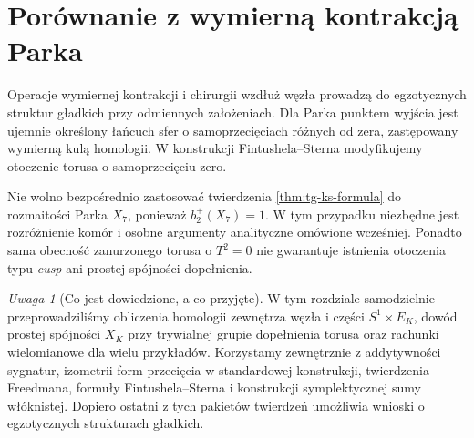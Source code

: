 \documentclass[11pt,a4paper]{report}
\numberwithin{equation}{section}
\theoremstyle{plain}
\theoremstyle{definition}
\theoremstyle{remark}
\newtheorem{uwaga}[twierdzenie]{Uwaga}
\begin{document}
\section{Porównanie z wymierną kontrakcją Parka}
\label{sec:tg-ks-compare}

Operacje wymiernej kontrakcji i chirurgii wzdłuż węzła
prowadzą do egzotycznych struktur gładkich przy
odmiennych założeniach. Dla Parka punktem wyjścia
jest ujemnie określony łańcuch sfer o samoprzecięciach
różnych od zera, zastępowany wymierną kulą homologii.
W konstrukcji Fintushela--Sterna modyfikujemy otoczenie
torusa o samoprzecięciu zero.

\begin{center}
\end{center}

Nie wolno bezpośrednio zastosować twierdzenia
\ref{thm:tg-ks-formula} do rozmaitości Parka $X_7$,
ponieważ $b_2^+(X_7)=1$. W tym przypadku
niezbędne jest rozróżnienie komór i osobne
argumenty analityczne omówione wcześniej.
Ponadto sama obecność zanurzonego torusa o
$T^2=0$ nie gwarantuje istnienia otoczenia typu
\emph{cusp} ani prostej spójności dopełnienia.

\begin{uwaga}[Co jest dowiedzione, a co przyjęte]
W tym rozdziale samodzielnie przeprowadziliśmy
obliczenia homologii zewnętrza węzła i części
$S^1\times E_K$, dowód prostej spójności
$X_K$ przy trywialnej grupie dopełnienia torusa
oraz rachunki wielomianowe dla wielu przykładów.
Korzystamy zewnętrznie z addytywności sygnatur,
izometrii form przecięcia w standardowej konstrukcji,
twierdzenia Freedmana, formuły Fintushela--Sterna
i konstrukcji symplektycznej sumy włóknistej.
Dopiero ostatni z tych pakietów twierdzeń
umożliwia wnioski o egzotycznych strukturach gładkich.
\end{uwaga}
\end{document}
